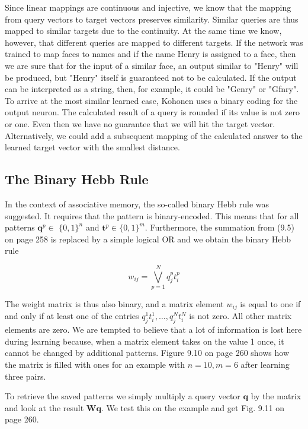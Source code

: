 \documentclass[10pt]{book}
\begin{document}
Since linear mappings are continuous and injective, we know that the mapping from query vectors to target vectors preserves similarity. Similar queries are thus mapped to similar targets due to the continuity. At the same time we know, however, that different queries are mapped to different targets. If the network was trained to map faces to names and if the name Henry is assigned to a face, then we are sure that for the input of a similar face, an output similar to "Henry" will be produced, but "Henry" itself is guaranteed not to be calculated. If the output can be interpreted as a string, then, for example, it could be "Genry" or "Gfnry". To arrive at the most similar learned case, Kohonen uses a binary coding for the output neuron. The calculated result of a query is rounded if its value is not zero or one. Even then we have no guarantee that we will hit the target vector. Alternatively, we could add a subsequent mapping of the calculated answer to the learned target vector with the smallest distance.

\subsection{The Binary Hebb Rule}
In the context of associative memory, the so-called binary Hebb rule was suggested. It requires that the pattern is binary-encoded. This means that for all patterns $\boldsymbol{q}^{p} \in$ $\{0,1\}^{n}$ and $\boldsymbol{t}^{p} \in\{0,1\}^{m}$. Furthermore, the summation from (9.5) on page 258 is replaced by a simple logical OR and we obtain the binary Hebb rule


\begin{equation*}
w_{i j}=\bigvee_{p=1}^{N} q_{j}^{p} t_{i}^{p} \tag{9.10}
\end{equation*}


The weight matrix is thus also binary, and a matrix element $w_{i j}$ is equal to one if and only if at least one of the entries $q_{j}^{1} t_{i}^{1}, \ldots, q_{j}^{N} t_{i}^{N}$ is not zero. All other matrix elements are zero. We are tempted to believe that a lot of information is lost here during learning because, when a matrix element takes on the value 1 once, it cannot be changed by additional patterns. Figure 9.10 on page 260 shows how the matrix is filled with ones for an example with $n=10, m=6$ after learning three pairs.

To retrieve the saved patterns we simply multiply a query vector $\boldsymbol{q}$ by the matrix and look at the result $\boldsymbol{W} \boldsymbol{q}$. We test this on the example and get Fig. 9.11 on page 260.
\end{document}
